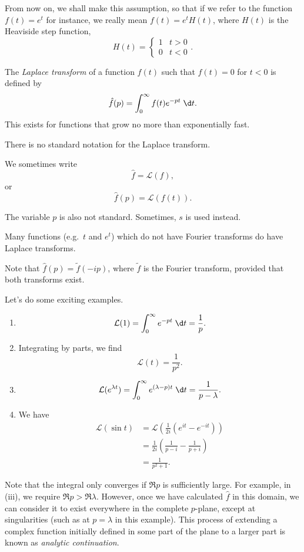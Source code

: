 \documentclass[a4paper]{article}
\begin{document}
From now on, we shall make this assumption, so that if we refer to the function $f(t) = e^t$ for instance, we really mean $f(t) = e^t H(t)$, where $H(t)$ is the Heaviside step function,
\[
  H(t) =
  \begin{cases}
    1 & t > 0\\
    0 & t < 0
  \end{cases}.
\]
\begin{defi}
  The \emph{Laplace transform} of a function $f(t)$ such that $f(t) = 0$ for $t < 0$ is defined by
  \[
    \hat{f}(p) = \int_0^\infty f(t) e^{-pt}\;\d t.
  \]
  This exists for functions that grow no more than exponentially fast.
\end{defi}
There is no standard notation for the Laplace transform.
\begin{notation}
  We sometimes write
  \[
    \hat{f} = \mathcal{L}(f),
  \]
  or
  \[
    \hat{f}(p) = \mathcal{L}(f(t)).
  \]
\end{notation}
The variable $p$ is also not standard. Sometimes, $s$ is used instead.

Many functions (e.g.\ $t$ and $e^t$) which do not have Fourier transforms do have Laplace transforms.

Note that $\hat{f}(p) = \tilde{f}(-ip)$, where $\tilde{f}$ is the Fourier transform, provided that both transforms exist.

\begin{eg}
  Let's do some exciting examples.
  \begin{enumerate}
    \item
      \[
        \mathcal{L}(1) = \int_0^\infty e^{-pt} \;\d t = \frac{1}{p}.
      \]
    \item Integrating by parts, we find
      \[
        \mathcal{L}(t) = \frac{1}{p^2}.
      \]
    \item
      \[
        \mathcal{L}(e^{\lambda t}) = \int_0^\infty e^{(\lambda - p)t}\;\d t = \frac{1}{p - \lambda}.
      \]
    \item We have
      \begin{align*}
        \mathcal{L}(\sin t) &= \mathcal{L}\left(\frac{1}{2i} \left(e^{it} - e^{-it}\right)\right) \\
        &= \frac{1}{2i} \left(\frac{1}{p - i} - \frac{1}{p + i}\right)\\
        &= \frac{1}{p^2 + 1}.
      \end{align*}
  \end{enumerate}
\end{eg}
Note that the integral only converges if $\Re p$ is sufficiently large. For example, in (iii), we require $\Re p > \Re \lambda$. However, once we have calculated $\hat{f}$ in this domain, we can consider it to exist everywhere in the complete $p$-plane, except at singularities (such as at $p = \lambda$ in this example). This process of extending a complex function initially defined in some part of the plane to a larger part is known as \emph{analytic continuation}.
\end{document}
